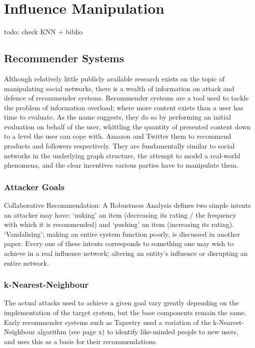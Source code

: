 \section{Influence Manipulation}

todo: check KNN + biblio

\subsection{Recommender Systems}

Although relatively little publicly available research exists on the topic of manipulating social networks, there is a wealth of information on attack and defence of recommender systems. Recommender systems are a tool used to tackle the problem of information overload; where more content exists than a user has time to evaluate. As the name suggests, they do so by performing an initial evaluation on behalf of the user, whittling the quantity of presented content down to a level the user can cope with. Amazon and Twitter them to recommend products and followers respectively. They are fundamentally similar to social networks in the underlying graph structure, the attempt to model a real-world phenomena, and the clear incentives various parties have to manipulate them.

\subsubsection{Attacker Goals}

Collaborative Recommendation: A Robustness Analysis defines two simple intents an attacker may have: `nuking' an item (decreasing its rating / the frequency with which it is recommended) and `pushing' an item (increasing its rating). `Vandalising'; making an entire system function poorly, is discussed in another paper. Every one of these intents corresponds to something one may wish to achieve in a real influence network; altering an entity's influence or disrupting an entire network.

\subsubsection{k-Nearest-Neighbour}

The actual attacks used to achieve a given goal vary greatly depending on the implementation of the target system, but the base components remain the same. Early recommender systems such as Tapestry used a variation of the k-Nearest-Neighbour algorithm (see page x) to identify like-minded people to new users, and uses this as a basis for their recommendations.  

